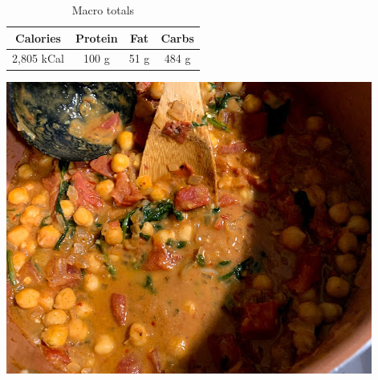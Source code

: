 \documentclass{report}
\begin{document}
\begin{multicols}{2}
\begin{enumerate}
\end{enumerate}
\begin{table}[H]
  \begin{center}
    \caption{Macro totals}
    \label{tab:table1}
    \begin{tabular}{c|c|c|c} %
      \textbf{Calories} & \textbf{Protein} & \textbf{Fat} & \textbf{Carbs}\\
      \hline
      2,805 kCal & 100 g & 51 g & 484 g\\
    \end{tabular}
  \end{center}
\end{table}
\end{multicols}



\vspace{4mm}
\begin{center}
\includegraphics[scale=0.65]{Vegetarian Recipes/Coconut Chickpea Curry/chickpeacurry.jpg}
\end{center}
\end{document}
